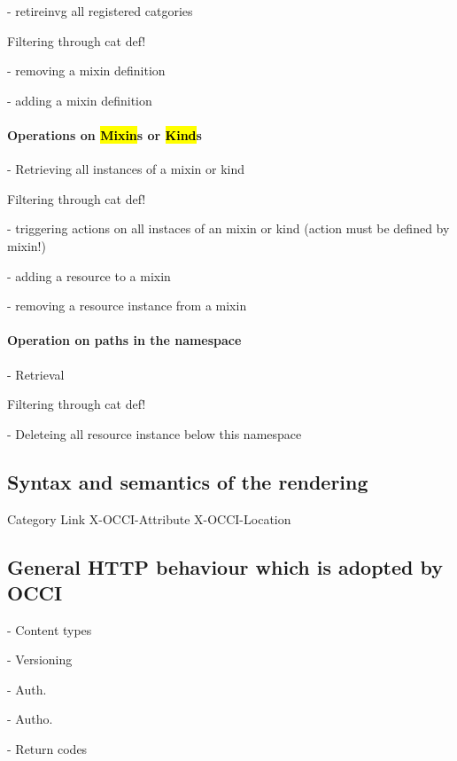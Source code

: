 \documentclass[10pt,a4paper]{article}
\begin{document}
- retireinvg all registered catgories


Filtering through cat def!


- removing a mixin definition

- adding a mixin definition

\paragraph{Operations on \hl{Mixin}s or \hl{Kind}s}

- Retrieving all instances of a mixin or kind


Filtering through cat def!


- triggering actions on all instaces of an mixin or kind (action must be defined by mixin!)

- adding a resource to a mixin

- removing a resource instance from a mixin

\paragraph{Operation on paths in the namespace}

- Retrieval

Filtering through cat def!

- Deleteing all resource instance below this namespace

\subsection{Syntax and semantics of the rendering}

 Category
 Link
 X-OCCI-Attribute
 X-OCCI-Location

\subsection{General HTTP behaviour which is adopted by OCCI}

- Content types

- Versioning

- Auth.

- Autho.

- Return codes
\end{document}
